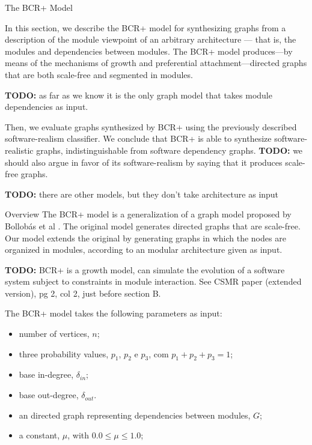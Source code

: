 \documentclass[11pt,twocolumn,a4paper,english]{article}
\newcommand{\TODO}{\textbf{TODO:} }
\begin{document}
\begin{section}{The BCR+ Model}	\label{sec:bcr}
	\newcommand{\din}[0]{\ensuremath{\delta_{in}}}
	\newcommand{\dout}[0]{\ensuremath{\delta_{out}}}
	\newcommand{\gin}[0]{\ensuremath{\mathrm{d}_{in}}}
	\newcommand{\gout}[0]{\ensuremath{\mathrm{d}_{out}}}
	
	In this section, we describe the BCR+ model for synthesizing graphs from a description of the module viewpoint of an arbitrary architecture --- that is, the modules and dependencies between modules. The BCR+ model produces---by means of the mechanisms of growth and preferential attachment---directed graphs that are both scale-free and segmented in modules.
	
	\TODO as far as we know it is the only graph model that takes module dependencies as input.
	
	Then, we evaluate graphs synthesized by BCR+ using the previously described software-realism classifier. We conclude that BCR+ is able to synthesize software-realistic graphs, indistinguishable from software dependency graphs. \TODO we should also argue in favor of its software-realism by saying that it produces scale-free graphs.
	
	\TODO there are other models, but they don't take architecture as input	
	
\begin{subsection}{Overview}
	The BCR+ model is a generalization of a graph model proposed by Bollobás et al \cite{Bollobas2003}. The original model generates directed graphs that are scale-free. Our model extends the original by generating graphs in which the nodes are organized in modules, according to an modular architecture given as input.
	
	\TODO BCR+ is a growth model, can simulate the evolution of a software system subject to constraints in module interaction. See CSMR paper (extended version), pg 2, col 2, just before section B. 
	
	The BCR+ model takes the following parameters as input:
	
	\begin{itemize}
  \item number of vertices, $n$;
  \item three probability values, $p_1$, $p_2$ e $p_3$, com $p_1 + p_2 + p_3 = 1$;
  \item base in-degree, $\din$;
  \item base out-degree, $\dout$.
  \item an directed graph representing dependencies between modules, $G$;
  \item a constant, $\mu$, with $0.0 \le \mu \le 1.0$;
  \end{itemize}
  

\end{subsection}
\end{section}
\end{document}

